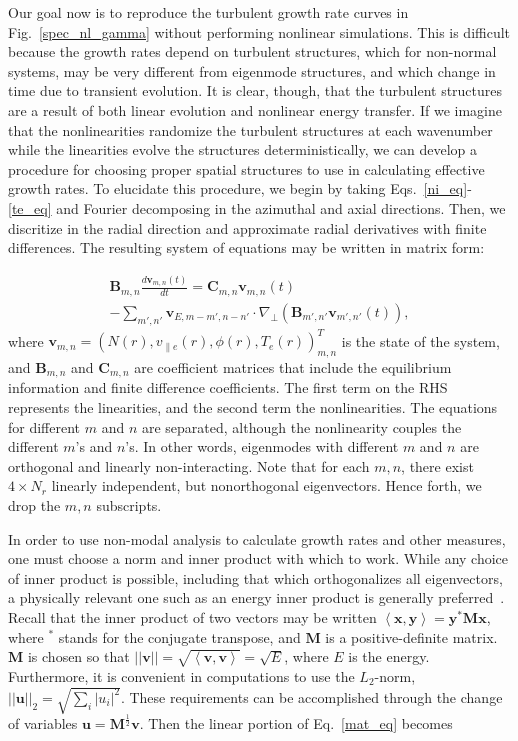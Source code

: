 \documentclass[letter,scriptaddress,twocolumn, prl,showkeys]{revtex4}
\def\beqar{\begin{eqnarray}}
\def\eeqar{\end{eqnarray}}
\newcommand{\diff}[2]{\frac{d#1}{d#2}}
\def\grad{\nabla}
\newcommand{\gradperp}{\grad_\perp}
\newcommand{\vpe}{v_{\parallel e}}
\begin{document}
Our goal now is to reproduce the turbulent growth rate curves in Fig.~\ref{spec_nl_gamma} without performing nonlinear simulations. This is difficult because the growth rates depend on turbulent
structures, which for non-normal systems, may be very different from eigenmode structures, and which change in time due to transient evolution.
It is clear, though, that the turbulent structures are a result of both linear evolution and nonlinear energy transfer. 
If we imagine that the nonlinearities randomize the turbulent structures at each wavenumber while the linearities evolve the structures
deterministically, we can develop a procedure for choosing proper spatial structures to use in calculating effective growth rates.
To elucidate this procedure, we begin by taking Eqs.~\ref{ni_eq}-\ref{te_eq} and Fourier decomposing in the azimuthal and axial directions.
Then, we discritize in the radial direction and approximate radial derivatives with finite differences. 
The resulting system of equations may be written in matrix form:

\beqar
\label{mat_eq}
\mathbf{B}_{m,n} \diff{\mathbf{v}_{m,n}(t)}{t} = \mathbf{C}_{m,n} \mathbf{v}_{m,n}(t) \nonumber \\
- \sum_{m',n'}  \mathbf{v}_{E,m-m',n-n'} \cdot \gradperp \left( \mathbf{B}_{m',n'} \mathbf{v}_{m',n'}(t) \right),
\eeqar
where $\mathbf{v}_{m,n} = \left( N(r), \vpe(r), \phi(r), T_e(r) \right)_{m,n}^{T}$ is the state of the system,
and $\mathbf{B}_{m,n}$ and $\mathbf{C}_{m,n}$ are coefficient matrices that include the equilibrium information and finite difference coefficients. The first term on the RHS represents the linearities,
and the second term the nonlinearities.
The equations for different $m$ and $n$ are separated, although the nonlinearity couples the different $m$'s and $n$'s. 
In other words, eigenmodes with different $m$ and $n$ are orthogonal and linearly non-interacting. Note that for each $m,n$, there exist $4 \times N_r$ linearly
independent, but nonorthogonal eigenvectors. Hence forth, we drop the $m,n$ subscripts.

In order to use non-modal analysis to calculate growth rates and other measures, one must choose a norm and inner product with which to work. While any choice of
inner product is possible, including that which orthogonalizes all eigenvectors, a physically relevant one such as an energy inner product 
is generally preferred~\cite{camargo1998,schmid2007,camporeale2010}. 
Recall that the inner product of two vectors may be written $\left< \mathbf{x},\mathbf{y} \right> = \mathbf{y}^{*} \mathbf{M} \mathbf{x}$,
where $^*$ stands for the conjugate transpose, and $\mathbf{M}$ is a positive-definite matrix. $\mathbf{M}$ is chosen so that 
$||\mathbf{v}|| = \sqrt{\left< \mathbf{v},\mathbf{v} \right>} = \sqrt{E}$, where $E$ is the energy. Furthermore, it is convenient in
computations to use the $L_2$-norm, $||\mathbf{u}||_2 = \sqrt{\sum_i |u_i|^2}$. These requirements can be accomplished through the change of variables $\mathbf{u} = \mathbf{M}^{\frac{1}{2}} \mathbf{v}$.
Then the linear portion of Eq.~\ref{mat_eq} becomes
\end{document}
